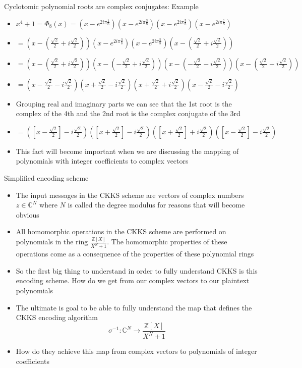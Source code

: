\documentclass{beamer}
\begin{document}
\begin{frame}{Cyclotomic polynomial roots are complex conjugates: Example}
	\begin{itemize}[<+->]
		\item $x^4 + 1 = \Phi_8(x) = (x - e^{2i \pi \frac{1}{8}})(x - e^{2i \pi \frac{3}{8}})(x - e^{2i \pi \frac{5}{8}})(x - e^{2i \pi \frac{7}{8}})$
		\item $ = (x - (\frac{\sqrt{2}}{2} + i\frac{\sqrt{2}}{2}))(x - e^{2i \pi \frac{3}{8}})(x - e^{2i \pi \frac{5}{8}})(x - (\frac{\sqrt{2}}{2} + i\frac{\sqrt{2}}{2}))$
		\item $ = (x - (\frac{\sqrt{2}}{2} + i\frac{\sqrt{2}}{2}))(x - (-\frac{\sqrt{2}}{2} + i\frac{\sqrt{2}}{2}))(x - (-\frac{\sqrt{2}}{2} - i\frac{\sqrt{2}}{2}))(x - (\frac{\sqrt{2}}{2} + i\frac{\sqrt{2}}{2}))$
		\item $ = (x -\frac{\sqrt{2}}{2} - i\frac{\sqrt{2}}{2})(x +\frac{\sqrt{2}}{2} - i\frac{\sqrt{2}}{2})(x +\frac{\sqrt{2}}{2} + i\frac{\sqrt{2}}{2})(x -\frac{\sqrt{2}}{2} - i\frac{\sqrt{2}}{2})$
		\item Grouping real and imaginary parts we can see that the 1st root is the complex of the 4th 
		and the 2nd root is the complex conjugate of the 3rd
		\item $= ([x -\frac{\sqrt{2}}{2}] - i\frac{\sqrt{2}}{2})([x +\frac{\sqrt{2}}{2}] - i\frac{\sqrt{2}}{2})([x +\frac{\sqrt{2}}{2}] + i\frac{\sqrt{2}}{2})([x -\frac{\sqrt{2}}{2}] - i\frac{\sqrt{2}}{2})$
		\item This fact will become important when we are discussing the mapping of polynomials with integer
		coefficients to complex vectors
	\end{itemize}
\end{frame}

\begin{frame}{Simplified encoding scheme}
	\begin{itemize}[<+->]
		\item The input messages in the CKKS scheme are vectors of complex numbers $z \in \mathbb{C}^N$
		where $N$ is called the degree modulus for reasons that will become obvious
		\item All homomorphic operations in the CKKS scheme are performed on polynomials in the ring
		$\frac{\mathbb{Z}[X]}{X^N + 1}$. The homomorphic properties of these operations come as a consequence
		of the properties of these polynomial rings
		\item So the first big thing to understand in order to fully understand CKKS is this encoding
		scheme. How do we get from our complex vectors to our plaintext polynomials
		\item The ultimate is goal to be able to fully understand the map that defines the CKKS encoding algorithm
		$$\sigma^{-1} : \mathbb{C}^N \to \frac{\mathbb{Z}[X]}{X^N + 1}$$
		\item How do they achieve this map from complex vectors to polynomials of integer coefficients

	\end{itemize}
\end{frame}
\end{document}
